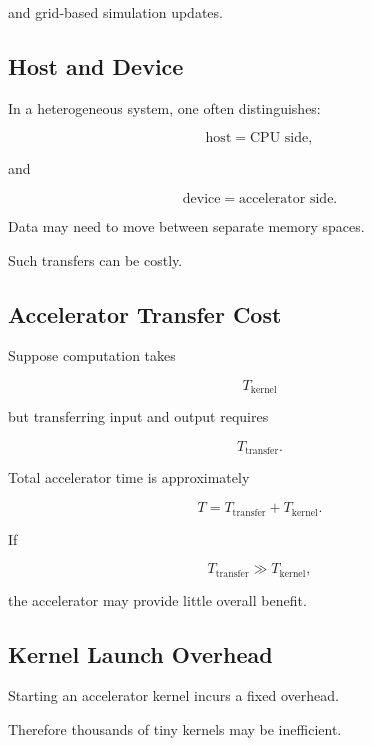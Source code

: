 and grid-based simulation updates.

\subsection{Host and Device}
\label{subsec:host-device}

In a heterogeneous system, one often distinguishes:

\[
\boxed{
\text{host}
=
\text{CPU side},
}
\]

and

\[
\boxed{
\text{device}
=
\text{accelerator side}.
}
\]

Data may need to move between separate memory spaces.

Such transfers can be costly.

\subsection{Accelerator Transfer Cost}
\label{subsec:accelerator-transfer-cost}

Suppose computation takes

\[
T_{\mathrm{kernel}}
\]

but transferring input and output requires

\[
T_{\mathrm{transfer}}.
\]

Total accelerator time is approximately

\[
\boxed{
T
=
T_{\mathrm{transfer}}
+
T_{\mathrm{kernel}}.
}
\]

If

\[
T_{\mathrm{transfer}}
\gg
T_{\mathrm{kernel}},
\]

the accelerator may provide little overall benefit.

\subsection{Kernel Launch Overhead}
\label{subsec:kernel-launch-overhead}

Starting an accelerator kernel incurs a fixed overhead.

Therefore thousands of tiny kernels may be inefficient.

